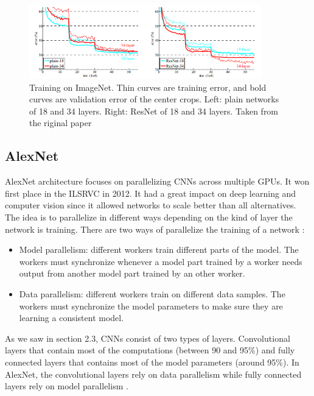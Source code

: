 \begin{figure}[!htp]
    \centering
        \includegraphics[width=0.9\textwidth]{figures/02-Resnet_comparing_acc}
        \caption[Degradation problem solved]{Training on ImageNet. Thin curves are training error, and bold curves are validation error of the center crops. Left: plain
networks of 18 and 34 layers. Right: ResNet of 18 and 34 layers. Taken from the riginal paper \cite{resnetpaper}}\label{fig:resnetaccs}
\end{figure}

\subsection{AlexNet}
AlexNet architecture focuses on parallelizing CNNs across multiple GPUs. It won first place in the ILSRVC in 2012. It had a great impact on deep learning and computer vision since it allowed networks to scale better than all alternatives.
The idea is to parallelize in different ways depending on the kind of layer the network is training\cite{alexpaper}. There are two ways of parallelize the training of a network : 
\begin{itemize}
    \item Model parallelism: different workers train different parts of the model. The workers must synchronize whenever a model part trained by a worker needs output from another model part trained by an other worker.  
    \item Data parallelism: different workers train on different data samples. The workers must synchronize the model parameters to make sure they are learning a consistent model. 
\end{itemize}
As we saw in section 2.3, CNNs consist of two types of layers. Convolutional layers that contain most of the computations (between 90 and 95\%) and fully connected layers that contains most of the model parameters (around 95\%). In AlexNet, the convolutional layers rely on data parallelism while fully connected layers rely on model parallelism \cite{alexpaper}. 

